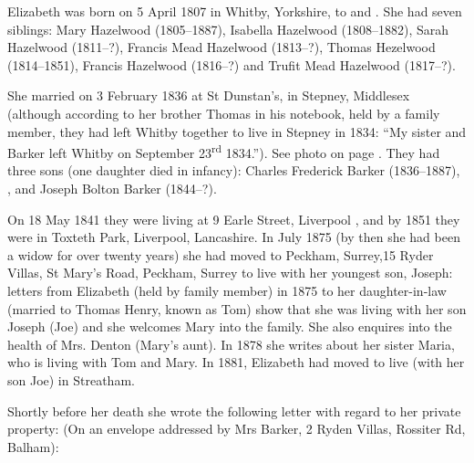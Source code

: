 
Elizabeth was born on 5 April 1807 \cite{ElizabethHazelwoodBirth} in Whitby, Yorkshire, to  and .  She had seven siblings: Mary Hazelwood (1805--1887), Isabella Hazelwood (1808--1882), Sarah Hazelwood (1811--?), Francis Mead Hazelwood (1813--?), Thomas Hezelwood (1814--1851), Francis Hazelwood (1816--?) and Trufit Mead Hazelwood (1817--?). 

She married  on 3 February 1836 at St Dunstan's, in Stepney, Middlesex \cite{ElizabethHazelwoodMarriage} (although according to her brother Thomas in his notebook, held by a family member, they had left Whitby together to live in Stepney in 1834: ``My sister and Barker left Whitby on September 23\textsuperscript{rd} 1834.'').
See photo on page \pageref{Charles_Frederick_Barker_and_Elizabeth_Hezelwood}.
They had three sons (one daughter died in infancy):  Charles Frederick Barker (1836--1887), , and Joseph Bolton Barker (1844--?).

On 18 May 1841 they were living at 9 Earle Street, Liverpool \cite{ElizabethHazelwoodResidence}, and by 1851 they were in Toxteth Park, Liverpool, Lancashire. In July 1875 (by then she had been a widow for over twenty years) she had moved to	Peckham, Surrey,15 Ryder Villas, St Mary's Road, Peckham, Surrey to live with her youngest son, Joseph: letters from Elizabeth (held by family member) in 1875 to her daughter-in-law (married to Thomas Henry, known as Tom) show that she was living with her son Joseph (Joe) and she welcomes Mary into the family. She also enquires into the health of Mrs. Denton (Mary's aunt). In 1878 she writes about her sister Maria, who is living with Tom and Mary. In 1881, Elizabeth had moved to live (with her son Joe) in Streatham. 

Shortly before her death she wrote the following letter with regard to her private property: (On an envelope addressed by Mrs Barker, 2 Ryden Villas, Rossiter Rd, Balham):

